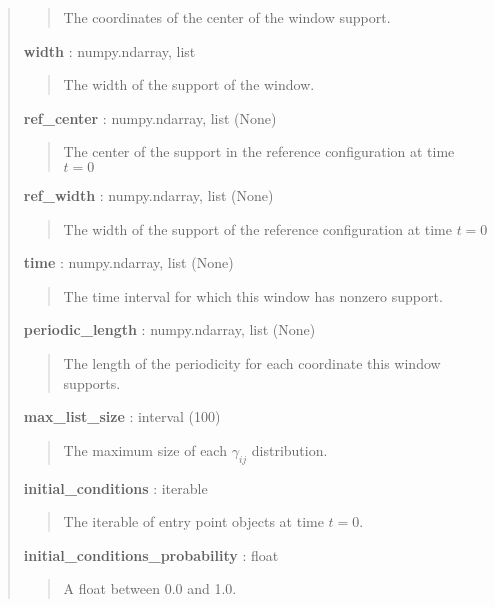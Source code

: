 \documentclass[letterpaper,10pt,english]{sphinxmanual}
\begin{document}
\begin{fulllineitems}
\begin{fulllineitems}
\begin{quote}
\begin{description}
\begin{quote}
The coordinates of the center of the window support.
\end{quote}

\textbf{width} : numpy.ndarray, list
\begin{quote}

The width of the support of the window.
\end{quote}

\textbf{ref\_center} : numpy.ndarray, list (None)
\begin{quote}

The center of the support in the reference configuration at time \(t=0\)
\end{quote}

\textbf{ref\_width} : numpy.ndarray, list (None)
\begin{quote}

The width of the support of the reference configuration at time \(t=0\)
\end{quote}

\textbf{time} : numpy.ndarray, list (None)
\begin{quote}

The time interval for which this window has nonzero support.
\end{quote}

\textbf{periodic\_length} : numpy.ndarray, list (None)
\begin{quote}

The length of the periodicity for each coordinate this window supports.
\end{quote}

\textbf{max\_list\_size} : interval (100)
\begin{quote}

The maximum size of each \(\gamma_{ij}\) distribution.
\end{quote}

\textbf{initial\_conditions} : iterable
\begin{quote}

The iterable of entry point objects at time \(t=0\).
\end{quote}

\textbf{initial\_conditions\_probability} : float
\begin{quote}

A float between 0.0 and 1.0.
\end{quote}

\end{description}\end{quote}


\end{fulllineitems}
\end{fulllineitems}
\end{document}
